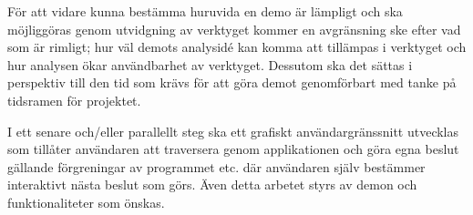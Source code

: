 För att vidare kunna bestämma huruvida en demo är lämpligt och ska möjliggöras
genom utvidgning av verktyget kommer en avgränsning ske efter vad som är rimligt;
hur väl demots analysidé kan komma att tillämpas i verktyget och hur analysen
ökar användbarhet av verktyget. Dessutom ska det sättas i perspektiv till den tid
som krävs för att göra demot genomförbart med tanke på tidsramen för projektet.

I ett senare och/eller parallellt steg ska ett grafiskt användargränssnitt
utvecklas som tillåter användaren att traversera genom applikationen och göra
egna beslut gällande förgreningar av programmet etc. där användaren själv
bestämmer interaktivt nästa beslut som görs. Även detta arbetet styrs av demon
och funktionaliteter som önskas.




%
